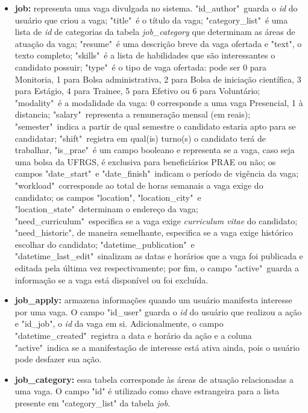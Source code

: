 \begin{itemize}
    \item \textbf{job:} representa uma vaga divulgada no sistema. "id\_author"\ guarda o \textit{id} do usuário que criou a vaga; "title"\ é o título da vaga; "category\_list"\ é uma lista de \textit{id} de categorias da tabela \textit{job\_category} que determinam as áreas de atuação da vaga; "resume"\ é uma descrição breve da vaga ofertada e "text", o texto completo; "skills"\ é a lista de habilidades que são interessantes o candidato possuir; "type"\ é o tipo de vaga ofertada: pode ser 0 para Monitoria, 1 para Bolsa administrativa, 2 para Bolsa de iniciação científica, 3 para Estágio, 4 para Trainee, 5 para Efetivo ou 6 para Voluntário; "modality"\ é a modalidade da vaga: 0 corresponde a uma vaga Presencial, 1 à distancia; "salary"\ representa a remuneração mensal (em reais); "semester"\ indica a partir de qual semestre o candidato estaria apto para se candidatar; "shift"\ registra em qual(is)  turno(s) o candidato terá de trabalhar, "is\_prae"\ é um campo booleano e representa se a vaga, caso seja uma bolsa da UFRGS, é exclusiva para beneficiários PRAE ou não; os campos "date\_start"\ e "date\_finish"\ indicam o período de vigência da vaga; "workload"\ corresponde ao total de horas semanais a vaga exige do candidato; os campos "location", "location\_city"\ e "location\_state"\ determinam o endereço da vaga; "need\_curriculum"\ especifica se a vaga exige \textit{curriculum vitae} do candidato; "need\_historic", de maneira semelhante, especifica se a vaga exige histórico escolhar do candidato; "datetime\_publication"\ e "datetime\_last\_edit"\ sinalizam as datas e horários que a vaga foi publicada e editada pela última vez respectivamente; por fim, o campo "active"\ guarda a informação se a vaga está disponível ou foi excluída.
    
    \item \textbf{job\_apply:} armazena informações quando um usuário manifesta interesse por uma vaga. O campo "id\_user" guarda o \textit{id} do usuário que realizou a ação e "id\_job", o \textit{id} da vaga em si. Adicionalmente, o campo "datetime\_created"\ registra a data e horário da ação e a coluna "active"\ indica se a manifestação de interesse está ativa ainda, pois o usuário pode desfazer sua ação.
    
    \item \textbf{job\_category:} essa tabela corresponde às áreas de atuação relacionadas a uma vaga. O campo "id" é utilizado como chave estrangeira para a lista presente em "category\_list" da tabela \textit{job}. 
    

\end{itemize}
